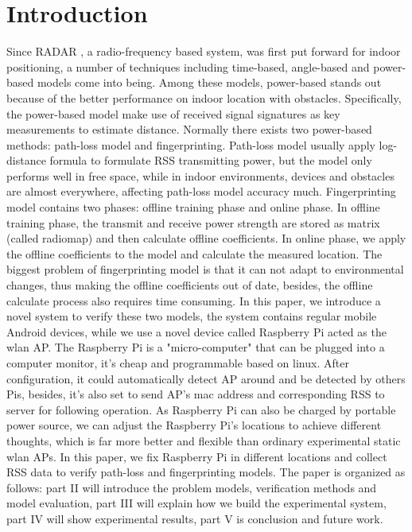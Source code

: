 \documentclass[10pt,conference]{IEEEtran}
\begin{document}
\section{Introduction}
Since RADAR \cite{radar}, a radio-frequency based system, was first put forward for indoor positioning, a number of techniques including time-based, angle-based and power-based models come into being. Among these models, power-based stands out because of the better performance on indoor location with obstacles. Specifically, the power-based model make use of received signal signatures as key measurements to estimate distance. Normally there exists two power-based methods: path-loss model and fingerprinting. Path-loss model usually apply log-distance formula to formulate RSS transmitting power, but the model only performs well in free space, while in indoor environments, devices and obstacles are almost everywhere, affecting path-loss model accuracy much. Fingerprinting model contains two phases: offline training phase and online phase. In offline training phase, the transmit and receive power strength are stored as matrix (called radiomap) and then calculate offline coefficients. In online phase, we apply the offline coefficients to the model and calculate the measured location. The biggest problem of fingerprinting model is that it can not adapt to environmental changes, thus making the offline coefficients out of date, besides, the offline calculate process also requires time consuming. In this paper, we introduce a novel system to verify these two models, the system contains regular mobile Android devices, while we use a novel device called Raspberry Pi \cite{raspberry} acted as the wlan AP. The Raspberry Pi is a "micro-computer" that can be plugged into a computer monitor, it's cheap and programmable based on linux. After configuration, it could automatically detect AP around and be detected by others Pis, besides, it's also set to send AP's mac address and corresponding RSS to server for following operation. As Raspberry Pi can also be charged by portable power source, we can adjust the Raspberry Pi's locations to achieve different thoughts, which is far more better and flexible than ordinary experimental static wlan APs. In this paper, we fix Raspberry Pi in different locations and collect RSS data to verify path-loss and fingerprinting models. The paper is organized as follows: part II will introduce the problem models, verification methods and model evaluation, part III will explain how we build the experimental system, part IV will show experimental results, part V is conclusion and future work.
\end{document}
